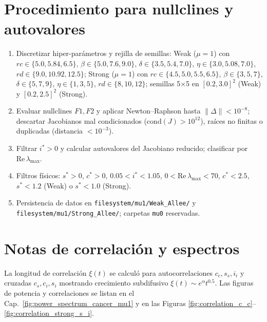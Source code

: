 \section{Procedimiento para nullclines y autovalores}
\begin{enumerate}
  \item Discretizar hiper-parámetros y rejilla de semillas: Weak ($\mu=1$) con $rc\in\{5.0,5.84,6.5\}$, $\beta\in\{5.0,7.6,9.0\}$, $\delta\in\{3.5,5.4,7.0\}$, $\eta\in\{3.0,5.08,7.0\}$, $rd\in\{9.0,10.92,12.5\}$; Strong ($\mu=1$) con $rc\in\{4.5,5.0,5.5,6.5\}$, $\beta\in\{3,5,7\}$, $\delta\in\{5,7,9\}$, $\eta\in\{1,3,5\}$, $rd\in\{8,10,12\}$; semillas 5×5 en $[0.2,3.0]^2$ (Weak) y $[0.2,2.5]^2$ (Strong).
  \item Evaluar nullclines $F1,F2$ y aplicar Newton–Raphson hasta $\|\Delta\|<10^{-8}$; descartar Jacobianos mal condicionados ($\mathrm{cond}(J)>10^{12}$), raíces no finitas o duplicadas (distancia $<10^{-3}$).
  \item Filtrar $i^*>0$ y calcular autovalores del Jacobiano reducido; clasificar por $\mathrm{Re}\,\lambda_{\max}$.
  \item Filtros físicos: $s^*>0$, $c^*>0$, $0.05<i^*<1.05$, $0<\mathrm{Re}\,\lambda_{\max}<70$, $c^*<2.5$, $s^*<1.2$ (Weak) o $s^*<1.0$ (Strong).
  \item Persistencia de datos en \texttt{filesystem/mu1/Weak\_Allee/} y \texttt{filesystem/mu1/Strong\_Allee/}; carpetas \texttt{mu0} reservadas.
\end{enumerate}

\section{Notas de correlación y espectros}
La longitud de correlación $\xi(t)$ se calculó para autocorrelaciones $c_c,s_s,i_i$ y cruzadas $c_s,c_i,s_i$ mostrando crecimiento subdifusivo $\xi(t)\sim e^{\alpha} t^{0.5}$. Las figuras de potencia y correlaciones se listan en el Cap.~\ref{fig:power_spectrum_cancer_mu1} y en las Figuras \ref{fig:correlation_c_c}--\ref{fig:correlation_strong_s_i}.




















